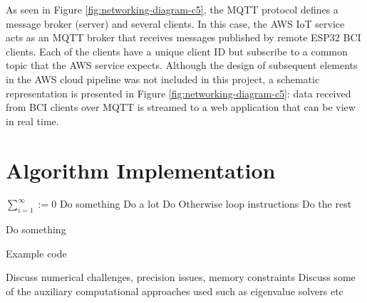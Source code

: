 As seen in Figure \ref{fig:networking-diagram-c5}, the MQTT protocol defines a message broker (server) and several clients. In this case, the AWS IoT service acts as an MQTT broker that receives messages published by remote ESP32 BCI clients. Each of the clients have a unique client ID but subscribe to a common topic that the AWS service expects. Although the design of subsequent elements in the AWS cloud pipeline was not included in this project, a schematic representation is presented in Figure \ref{fig:networking-diagram-c5}: data received from BCI clients over MQTT is streamed to a web application that can be view in real time.


\section{Algorithm Implementation}

\begin{algorithm}[H]
\DontPrintSemicolon
  
  $\sum_{i=1}^{\infty} := 0$ 
    {
        Do something    
        {Do a lot}
    }
    {
    	Do Otherwise \;
        { 
        	loop instructions
        }
    }
    \Else
    {
    	Do the rest
    }
    
   {
   		Do something\;
   }

\caption{Example code}
\end{algorithm}


Discuss numerical challenges, precision issues, memory constraints
Discuss some of the auxiliary computational approaches used such as eigenvalue solvers etc

